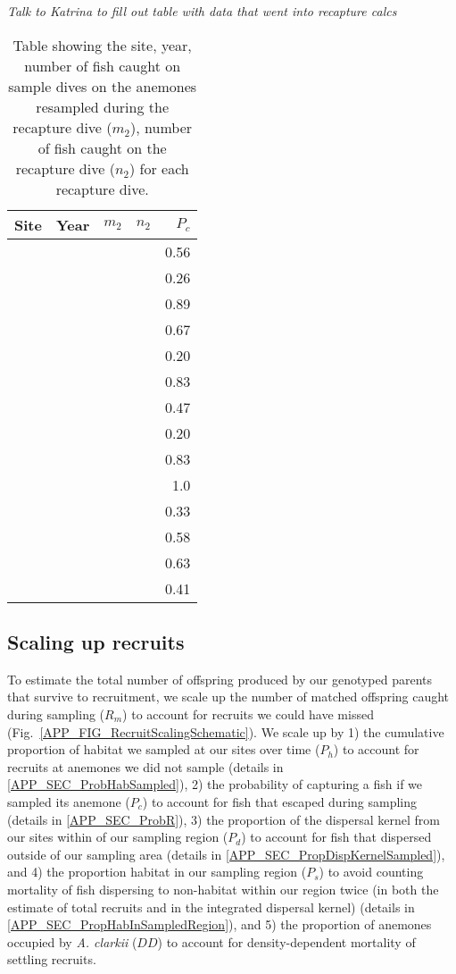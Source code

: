 \documentclass[12pt, oneside]{article}   	%
\begin{document}
\textit{Talk to Katrina to fill out table with data that went into recapture calcs}

\begin{table}
\begin{centering}
\begin{tabular}{|l|r|r|r|r|}
\hline
Site & Year & $m_2$ & $n_2$ & $P_c$ \\ \hline
& & & & 0.56 \\ \hline
& & & & 0.26 \\ \hline
& & & & 0.89 \\ \hline
& & & & 0.67 \\ \hline
& & & & 0.20 \\ \hline
& & & & 0.83 \\ \hline
& & & & 0.47 \\ \hline
& & & & 0.20 \\ \hline
& & & & 0.83 \\ \hline
& & & & 1.0 \\ \hline
& & & & 0.33 \\ \hline
& & & & 0.58 \\ \hline
& & & & 0.63 \\ \hline
& & & & 0.41 \\ \hline
\end{tabular}
\end{centering}
\caption{Table showing the site, year, number of fish caught on sample dives on the anemones resampled during the recapture dive ($m_2$), number of fish caught on the recapture dive ($n_2$) for each recapture dive.} \label{APP_TAB_RecapDives}
\end{table}

\newpage{}

\subsection{Scaling up recruits}

To estimate the total number of offspring produced by our genotyped parents that survive to recruitment, we scale up the number of matched offspring caught during sampling ($R_m$) to account for recruits we could have missed (Fig.\ \ref{APP_FIG_RecruitScalingSchematic}). We scale up by 1) the cumulative proportion of habitat we sampled at our sites over time ($P_h$) to account for recruits at anemones we did not sample (details in \ref{APP_SEC_ProbHabSampled}), 2) the probability of capturing a fish if we sampled its anemone ($P_c$) to account for fish that escaped during sampling (details in \ref{APP_SEC_ProbR}), 3) the proportion of the dispersal kernel from our sites within of our sampling region ($P_d$) to account for fish that dispersed outside of our sampling area (details in \ref{APP_SEC_PropDispKernelSampled}), and 4) the proportion habitat in our sampling region ($P_s$) to avoid counting mortality of fish dispersing to non-habitat within our region twice (in both the estimate of total recruits and in the integrated dispersal kernel) (details in \ref{APP_SEC_PropHabInSampledRegion}), and 5) the proportion of anemones occupied by \textit{A. clarkii} ($DD$) to account for density-dependent mortality of settling recruits.
\end{document}
